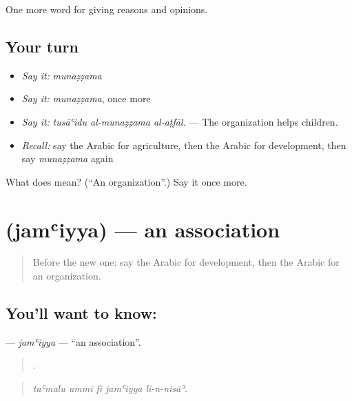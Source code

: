 \begin{grammarlens}[title={What you've built}]
One more word for giving reasons and opinions.
\end{grammarlens}

\subsection*{Your turn}
\begin{itemize}
\raggedright
  \item \emph{Say it:} \emph{munaẓẓama}
  \item \emph{Say it:} \emph{munaẓẓama}, once more
  \item \emph{Say it:} \emph{tusāʿidu al-munaẓẓama al-aṭfāl.} — The organization helps children.
  \item \emph{Recall:} say the Arabic for agriculture, then the Arabic for development, then say \emph{munaẓẓama} again
\end{itemize}

\begin{tcolorbox}[breakable,colback=teal!4,colframe=teal!35!black,title={Before you move on}]
What does  mean? (\textquotedblleft{}An organization\textquotedblright{}.) Say it once more.
\end{tcolorbox}
\section[\texorpdfstring{\ar{جمعية} (jamʿiyya)}{جمعية (jamʿiyya)}]{ (jamʿiyya) — an association}

\label{lesson:AR-C385-jamiyya}



\begin{quote}
Before the new one: say the Arabic for development, then the Arabic for an organization.
\end{quote}

\subsection*{You'll want to know: }
\textbf{} — \emph{jamʿiyya} — \textquotedblleft{}an association\textquotedblright{}.

\begin{quote}
    .
\end{quote}

\begin{quote}
\emph{taʿmalu ummī fī jamʿiyya li-n-nisāʾ.}
\end{quote}

